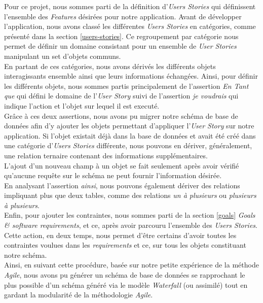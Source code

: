 \documentclass[a4paper,11pt]{article}
\begin{document}
Pour ce projet, nous sommes parti de la définition d'\emph{Users Stories} qui définissent l'ensemble des \emph{Features} désirées pour notre application.  Avant de développer l'application, nous avons classé les différentes \emph{Users Stories} en catégories, comme présenté dans la section \vref{users-stories}. 
Ce regroupement par catégorie nous permet de définir un domaine consistant pour un ensemble de \emph{User Stories} manipulant un set d'objets communs.\\
En partant de ces catégories, nous avons dérivés les différents objets interagissants ensemble ainsi que leurs informations échangées. Ainsi, pour définir les différents objets, nous sommes partis principalement de l'assertion \emph{En Tant que} qui défini le domaine de l'\emph{User Story} suivi de l'assertion \emph{je voudrais} qui indique l'action et l'objet sur lequel il est executé.\\
Grâce à ces deux assertions, nous avons pu migrer notre schéma de base de données afin d'y ajouter les objets permettant d'appliquer l'\emph{User Story} sur notre application. Si l'objet existait déjà dans la base de données et avait été créé dans une catégorie d'\emph{Users Stories} différente, nous pouvons en dériver, généralement, une relation ternaire contenant des informations supplémentaires.\\
L'ajout d'un nouveau champ à un objet se fait seulement après avoir vérifié qu'aucune requête sur le schéma ne peut fournir l'information désirée.\\
En analysant l'assertion \emph{ainsi}, nous pouvons également dériver des relations impliquant plus que deux tables, comme des relations \textit{un à plusieurs} ou \textit{plusieurs à plusieurs}.\\
Enfin, pour ajouter les contraintes, nous sommes parti de la section \vref{goals} \textit{Goals \& software requirements}, et ce, après avoir parcouru l'ensemble des \emph{Users Stories}.  Cette action, en deux temps, nous permet d'être certains d'avoir toutes les contraintes voulues dans les \textit{requirements} et ce, sur tous les objets constituant notre schéma.\\

Ainsi, en suivant cette procédure, basée sur notre petite expérience de la méthode \textit{Agile}, nous avons pu générer un schéma de base de données se rapprochant le plus possible d'un schéma généré via le modèle \emph{Waterfall} (ou assimilé) tout en gardant la modularité de la méthodologie \emph{Agile}.\\
\end{document}
